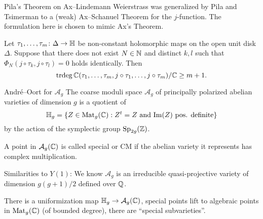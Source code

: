 \documentclass{beamer}
\begin{document}
\begin{frame}
  Pila's Theorem on Ax--Lindemann Weierstrass
  was generalized by Pila and Tsimerman to a (weak) Ax--Schanuel
  Theorem for the $j$-function. The formulation here is chosen to
  mimic Ax's Theorem.

  \begin{theorem}
    Let $\tau_1,\ldots,\tau_m\colon\Delta\rightarrow{\mathbb{H}}$ be
    non-constant holomorphic maps on the open unit disk $\Delta$.
    Suppose that there does not exist $N\in{\mathbb{N}}$ and distinct $k,l$
    such that $\Phi_N(j\circ\tau_k,j\circ \tau_l)=0$ holds
    identically. Then
    \begin{equation*}
      \mathrm{trdeg}\,{\mathbb{C}}(\tau_1,\ldots,\tau_m,j\circ\tau_1,\ldots,j\circ\tau_m)/{\mathbb{C}}
      \ge m+1.
    \end{equation*}
  \end{theorem}   
\end{frame}

\begin{frame}{Andr\'e--Oort for $\mathcal{A}_g$}
  The coarse moduli space $\mathcal{A}_g$ of principally polarized abelian varieties
  of dimension $g$ is a quotient of
  \begin{equation*}
    {\mathbb{H}}_g = \{Z\in \mathrm{Mat}_{g}({{\mathbb{C}}}) : Z^t = Z \text{ and }
    \mathrm{Im}(Z) \text{ pos. definite}\}
  \end{equation*}
  by the action of the symplectic group $\mathrm{Sp}_{2g}({\mathbb{Z}})$.
  
  \begin{definition}
    A point in $\mathcal{A}_g({\mathbb{C}})$ is called \alert{special} or
    \alert{CM}
    if the abelian
    variety  it represents has complex
    multiplication. 
  \end{definition}

  Similarities to $Y(1)$:
  We know $\mathcal{A}_g$ is an irreducible quasi-projective variety of
  dimension $g(g+1)/2$ defined over ${\mathbb{Q}}$.
  
  There is a uniformization map
    ${\mathbb{H}}_g \rightarrow \mathcal{A}_g({\mathbb{C}})$,
  special points lift to algebraic points in $\mathrm{Mat}_{g}({{\mathbb{C}}})$ (of
  bounded degree), there are ``special subvarieties''.
\end{frame}
\end{document}
